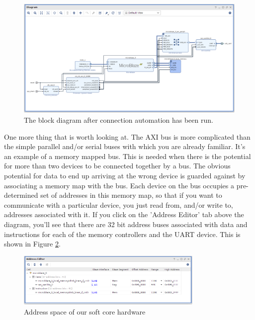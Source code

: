 \documentclass[../physical_computing.tex]{subfiles}
\begin{document}
\begin{figure}[h!]
    \centering
    \includegraphics[width=\textwidth]{appendix_8/figures/afterconnectionautomation.png}
    \caption{The block diagram after connection automation has been run.}
    \label{fig:afterconnectionautomation}
\end{figure}

One more thing that is worth looking at. The AXI bus is more complicated than the simple parallel and/or serial buses with which you
are already familiar. It's an example of a memory mapped bus. This is needed when there is the potential for more than two devices
to be connected together by a bus. The obvious potential for data to end up arriving at the wrong device is guarded against by
associating a memory map with the bus. Each device on the bus occupies a pre-determined set of addresses in this memory map, so that
if you want to communicate with a particular device, you just read from, and/or write to, addresses associated with it. If you 
click on the 'Address Editor' tab above the diagram, you'll see that there are 32 bit address buses associated with data and 
instructions for each of the memory controllers and the UART device. This is shown in Figure \ref{fig:memorymap}.

\begin{figure}[h!]
    \centering
    \includegraphics[width=0.8\textwidth]{appendix_8/figures/memorymap.png}
    \caption{Address space of our soft core hardware}
    \label{fig:memorymap}
\end{figure}
\end{document}
